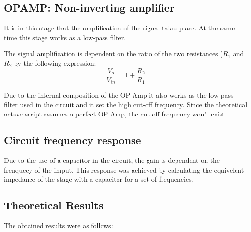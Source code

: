 \subsection{OPAMP: Non-inverting amplifier}
\label{subsec:envdet}

It is in this stage that the amplification of the signal takes place. At the same time this stage works as a low-pass filter.

The signal amplification is dependent on the ratio of the two resistances (\(R_1\) and \(R_2\) by the following expression:
\[
\frac{V_o}{V_{in}} = 1 + \frac{R_2}{R_1}
\]

Due to the internal composition of the OP-Amp it also works as the low-pass filter used in the circuit and it set the high cut-off frequency. Since the theoretical octave script assumes a perfect OP-Amp, the cut-off frequency won't exist.


\subsection {Circuit frequency response}
Due to the use of a capacitor in the circuit, the gain is dependent on the frenquecy of the imput. This response was achieved by calculating the equivelent impedance of the stage with a capacitor for a set of frequencies.



\subsection{Theoretical Results}
\label{subsec:res_the}

The obtained results were as follows:

%   		
%	
%   

%   		
%	


